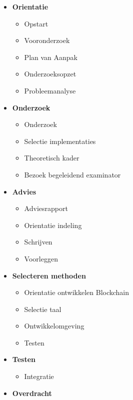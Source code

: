 \begin{multicols}{2}
  \begin{itemize}[noitemsep]
    \item \textbf{Orientatie}
    \begin{itemize}[noitemsep]
      \item Opstart
      \item Vooronderzoek
      \item Plan van Aanpak
      \item Onderzoeksopzet
      \item Probleemanalyse
    \end{itemize}
    \item \textbf{Onderzoek}
    \begin{itemize}[noitemsep]
      \item Onderzoek
      \item Selectie implementaties
      \item Theoretisch kader
      \item Bezoek begeleidend examinator
    \end{itemize}
    \item \textbf{Advies}
    \begin{itemize}[noitemsep]
      \item Adviesrapport
      \item Orientatie indeling
      \item Schrijven
      \item Voorleggen
    \end{itemize}
    \item \textbf{Selecteren methoden}
    \begin{itemize}
      \item Orientatie ontwikkelen Blockchain
      \item Selectie taal
      \item Ontwikkelomgeving
      \item Testen
    \end{itemize}
    \item \textbf{Testen}
    \begin{itemize}[noitemsep]
      \item Integratie
    \end{itemize}
    \item \textbf{Overdracht}
  \end{itemize}
\end{multicols}
